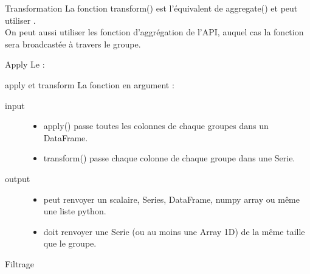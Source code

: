 \begin{frame}{Transformation}
  La fonction transform() est l'équivalent de aggregate() et peut utiliser   . \\
  On peut aussi utiliser les fonction d'aggrégation de l'API, auquel cas la fonction sera broadcastée à travers le groupe.
\end{frame}

\begin{frame}{Apply}
  Le  :
\end{frame}

\begin{frame}{apply et transform}
  La fonction en argument :
  \begin{description}
    \item[input]  \begin{itemize}
                    \item apply() passe toutes les colonnes de chaque groupes dans un DataFrame.
                    \item transform() passe chaque colonne de chaque groupe dans une Serie.
                  \end{itemize}
    \item[output]  \begin{itemize}
                    \item peut renvoyer un scalaire, Series, DataFrame, numpy array ou même une liste python.
                    \item doit renvoyer une Serie (ou au moins une Array 1D) de la même taille que le groupe.
                  \end{itemize}
  \end{description}
\end{frame}

\begin{frame}{Filtrage}
\end{frame}
